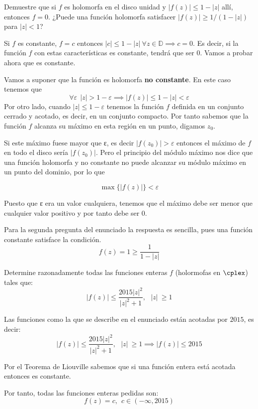 \begin{problem}[7]
Demuestre que si $f$ es holomorfa en el disco unidad y $|f(z)|\leq 1-|z|$ allí, entonces $f=0$. ¿Puede una función holomorfa satisfacer $|f(z)| \geq 1/(1-|z|)$ para $|z| < 1$?
\solution


Si $f$ es constante, $f=c$ entonces $|c| \leq 1-|z| \ \forall z \in \mathbb{D} \implies c=0$. Es decir, si la función $f$ con estas características es constante, tendrá que ser 0. Vamos a probar ahora que es constante.

Vamos a suponer que la función es holomorfa \textbf{no constante}. En este caso tenemos que
\[\forall ε \ \ |z|>1-ε \implies |f(z)| \leq 1-|z| < ε\]
Por otro lado, cuando $|z|\leq 1-ε$ tenemos la función $f$ definida en un conjunto cerrado y acotado, es decir, en un conjunto compacto. Por tanto sabemos que la función $f$ alcanza su máximo en esta región en un punto, digamos $z_0$.

Si este máximo fuese mayor que ε, es decir $|f(z_0)|>ε$ entonces el máximo de $f$ en todo el disco sería $|f(z_0)|$. Pero el principio del módulo máximo nos dice que una función holomorfa y no constante no puede alcanzar su módulo máximo en un punto del dominio, por lo que

\[\max\{|f(z)|\}<ε\]

Puesto que ε era un valor cualquiera, tenemos que el máximo debe ser menor que cualquier valor positivo y por tanto debe ser 0.

Para la segunda pregunta del enunciado la respuesta es sencilla, pues una función constante satisface la condición.
\[f(z)=1\geq \frac{1}{1-|z|}\]
\end{problem}

\begin{problem}[8]
Determine razonadamente todas las funciones enteras $f$ (holormofas en $\cplex$) tales que:
\[|f(z)| \leq \frac{2015|z|^2}{|z|^2+1}, \ \ \ |z|\ \geq 1\]
\solution
{}

Las funciones como la que se describe en el enunciado están acotadas por $2015$, es decir:
\[|f(z)| \leq \frac{2015|z|^2}{|z|^2+1}, \ \ \ |z|\ \geq 1 \implies |f(z)| \leq 2015\]

Por el Teorema de Liouville sabemos que si una función entera está acotada entonces es constante.

Por tanto, todas las funciones enteras pedidas son:
\[f(z)=c, \ \ c \in (-\infty,2015)\]
\end{problem}

